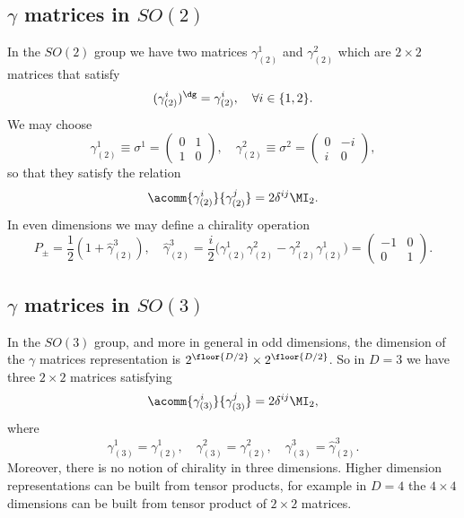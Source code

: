 \subsection{\texorpdfstring{$\gamma$}{gamma} matrices in \texorpdfstring{$SO(2)$}{SO(2)}}
In the $SO(2)$ group we have two matrices $\gamma^1_{(2)}$ and $\gamma^2_{(2)}$ which are $2 \times 2$ matrices that satisfy
\begin{equation}
    (\gamma^i_{(2)})^\dg = \gamma^i_{(2)},\quad \forall i \in \{1,2\}.
\end{equation}
We may choose
\begin{equation}
    \gamma^1_{(2)} \equiv \sigma^1 = 
    \begin{pmatrix}
        0 & 1 \\
        1 & 0
    \end{pmatrix},\quad \gamma^2_{(2)} \equiv \sigma^2 = 
    \begin{pmatrix}
        0 & -i \\
        i & 0
    \end{pmatrix},
\end{equation}
so that they satisfy the relation 
\begin{equation}
    \acomm{\gamma^i_{(2)}}{\gamma^j_{(2)}} = 2\delta^{ij}\MI_2.
\end{equation}
In even dimensions we may define a chirality operation
\begin{equation}
    P_\pm = \frac{1}{2}(1 + \hat{\gamma}^3_{(2)}),\quad \hat{\gamma}^3_{(2)} = \frac{i}{2}\bigg(\gamma^1_{(2)}\gamma^2_{(2)} - \gamma^2_{(2)}\gamma^1_{(2)}\bigg) = 
    \begin{pmatrix}
        -1 & 0 \\
        0 & 1
    \end{pmatrix}.
\end{equation}

\subsection{\texorpdfstring{$\gamma$}{gamma} matrices in \texorpdfstring{$SO(3)$}{SO(3)}}
In the $SO(3)$ group, and more in general in odd dimensions, the dimension of the $\gamma$ matrices representation is $2^{\floor{D/2}} \times 2^{\floor{D/2}}$. So in $D = 3$ we have three $2 \times 2$ matrices satisfying
\begin{equation}
    \acomm{\gamma^i_{(3)}}{\gamma^j_{(3)}} = 2\delta^{ij}\MI_2,
\end{equation}
where
\begin{equation}
    \gamma^1_{(3)} = \gamma^1_{(2)},\quad \gamma^2_{(3)} = \gamma^2_{(2)},\quad \gamma^3_{(3)} = \hat{\gamma}^3_{(2)}.
\end{equation}
Moreover, there is no notion of chirality in three dimensions. Higher dimension representations can be built from tensor products, for example in $D = 4$ the $4 \times 4$ dimensions can be built from tensor product of $2 \times 2$ matrices. 

